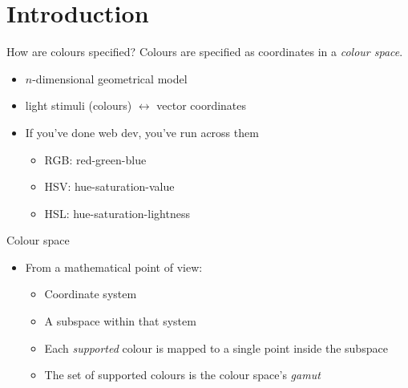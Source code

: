 \documentclass[aspectratio=169]{fireshonks}
\begin{document}
\section{Introduction}
\begin{frame}{How are colours specified?}
  Colours are specified as coordinates in a \emph{colour space}.
  \begin{itemize}[<+(1)->]
    \item $n$-dimensional geometrical model
    \item light stimuli (colours) $\leftrightarrow$ vector coordinates
    \item If you've done web dev, you've run across them
          \begin{itemize}
            \item RGB: red-green-blue
            \item HSV: hue-saturation-value
            \item HSL: hue-saturation-lightness
          \end{itemize}
  \end{itemize}
\end{frame}
\begin{frame}{Colour space}
  \begin{itemize}
    \item From a mathematical point of view:
          \begin{itemize}
            \item Coordinate system
            \item A subspace within that system
            \item Each \emph{supported} colour is mapped to a single point inside the subspace
            \item The set of supported colours is the colour space's \emph{gamut}
          \end{itemize}
  \end{itemize}
\end{frame}
\end{document}
